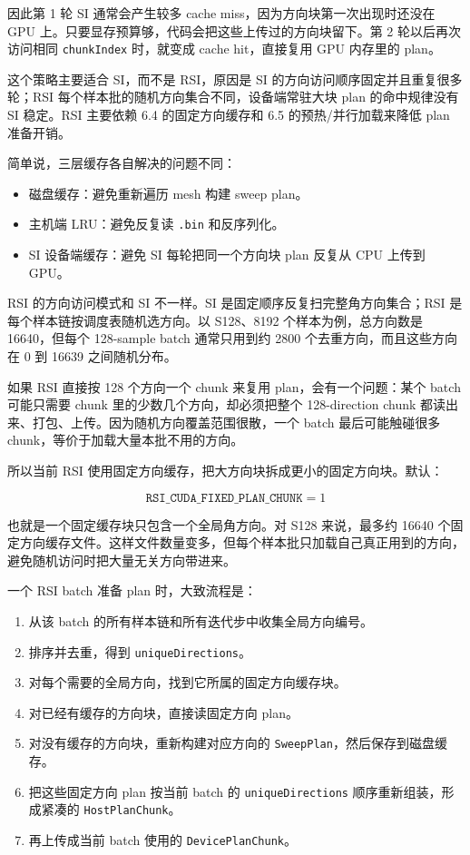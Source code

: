 \documentclass[10pt]{article}
\newcommand{\subsect}[1]{\vspace{2mm}{\sffamily\large\bfseries #1}\par}
\newcommand{\code}[1]{\texttt{#1}}
\begin{document}
因此第 1 轮 SI 通常会产生较多 cache miss，因为方向块第一次出现时还没在 GPU 上。只要显存预算够，代码会把这些上传过的方向块留下。第 2 轮以后再次访问相同 \code{chunkIndex} 时，就变成 cache hit，直接复用 GPU 内存里的 plan。

这个策略主要适合 SI，而不是 RSI，原因是 SI 的方向访问顺序固定并且重复很多轮；RSI 每个样本批的随机方向集合不同，设备端常驻大块 plan 的命中规律没有 SI 稳定。RSI 主要依赖 6.4 的固定方向缓存和 6.5 的预热/并行加载来降低 plan 准备开销。

简单说，三层缓存各自解决的问题不同：

\begin{itemize}
\item 磁盘缓存：避免重新遍历 mesh 构建 sweep plan。
\item 主机端 LRU：避免反复读 \code{.bin} 和反序列化。
\item SI 设备端缓存：避免 SI 每轮把同一个方向块 plan 反复从 CPU 上传到 GPU。
\end{itemize}

\subsect{6.4 RSI 固定方向缓存}

RSI 的方向访问模式和 SI 不一样。SI 是固定顺序反复扫完整角方向集合；RSI 是每个样本链按调度表随机选方向。以 S128、8192 个样本为例，总方向数是 16640，但每个 128-sample batch 通常只用到约 2800 个去重方向，而且这些方向在 0 到 16639 之间随机分布。

如果 RSI 直接按 128 个方向一个 chunk 来复用 plan，会有一个问题：某个 batch 可能只需要 chunk 里的少数几个方向，却必须把整个 128-direction chunk 都读出来、打包、上传。因为随机方向覆盖范围很散，一个 batch 最后可能触碰很多 chunk，等价于加载大量本批不用的方向。

所以当前 RSI 使用固定方向缓存，把大方向块拆成更小的固定方向块。默认：

\[
\code{RSI\_CUDA\_FIXED\_PLAN\_CHUNK}=1
\]

也就是一个固定缓存块只包含一个全局角方向。对 S128 来说，最多约 16640 个固定方向缓存文件。这样文件数量变多，但每个样本批只加载自己真正用到的方向，避免随机访问时把大量无关方向带进来。

一个 RSI batch 准备 plan 时，大致流程是：

\begin{enumerate}
\item 从该 batch 的所有样本链和所有迭代步中收集全局方向编号。
\item 排序并去重，得到 \code{uniqueDirections}。
\item 对每个需要的全局方向，找到它所属的固定方向缓存块。
\item 对已经有缓存的方向块，直接读固定方向 plan。
\item 对没有缓存的方向块，重新构建对应方向的 \code{SweepPlan}，然后保存到磁盘缓存。
\item 把这些固定方向 plan 按当前 batch 的 \code{uniqueDirections} 顺序重新组装，形成紧凑的 \code{HostPlanChunk}。
\item 再上传成当前 batch 使用的 \code{DevicePlanChunk}。
\end{enumerate}
\end{document}
